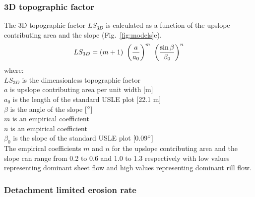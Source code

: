 \documentclass[gmd, manuscript]{copernicus}
\begin{document}

\subsubsection{3D topographic factor}
The 3D topographic factor $LS_{3D}$
is calculated as a function of the upslope contributing area
and the slope (Fig.~\ref{fig:models}e). 
\begin{equation}
\label{eq:ls_factor}
LS_{3D} = (m+1) ~ \left({a \over a_0}\right)^m ~ \left({\sin \beta \over \beta_0}\right)^n
\end{equation}
%
{\small
\noindent
where: \\
\noindent
\hspace*{0.5em} $LS_{3D}$ is the dimensionless topographic factor\\
\hspace*{0.5em} $a$ is upslope contributing area per unit width [\unit{m}]\\
\hspace*{0.5em} $a_0$ is the length of the standard USLE plot [22.1 \unit{m}]\\
\hspace*{0.5em} $\beta$ is the angle of the slope [$^{\circ}$]\\
\hspace*{0.5em} $m$ is an empirical coefficient\\
\hspace*{0.5em} $n$ is an empirical coefficient\\
\hspace*{0.5em} $\beta_0$ is the slope of the standard USLE plot [0.09$^{\circ}$]\\
}
The empirical coefficients $m$ and $n$
for the upslope contributing area and the slope
can range from 0.2 to 0.6 and 1.0 to 1.3 respectively
with low values representing dominant sheet flow
and high values representing dominant rill flow.


\subsubsection{Detachment limited erosion rate}
\end{document}
